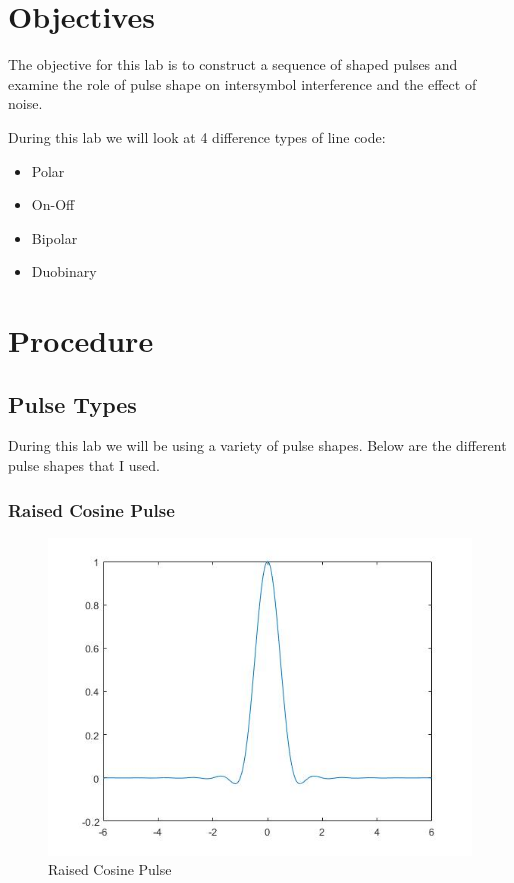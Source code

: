 \documentclass{article}
\begin{document}
\section{Objectives}
\indent
The objective for this lab is to construct a sequence of shaped pulses and examine the role of pulse shape on intersymbol interference and the effect of noise.

\noindent
During this lab we will look at 4 difference types of line code:
  \begin{itemize}
    \item Polar
    \item On-Off
    \item Bipolar
    \item Duobinary
  \end{itemize}

\section{Procedure}

\subsection{Pulse Types}
During this lab we will be using a variety of pulse shapes. Below are the different pulse shapes that I used.

\subsubsection{Raised Cosine Pulse}
\begin{figure}[H]
  \begin{center}
    \includegraphics[width = 0.4\linewidth]{Raised_Cosine_Pulse.jpg}
    \caption{Raised Cosine Pulse}
    \label{fig:Raised_Cosine_Pulse}
  \end{center}
\end{figure}
\end{document}
